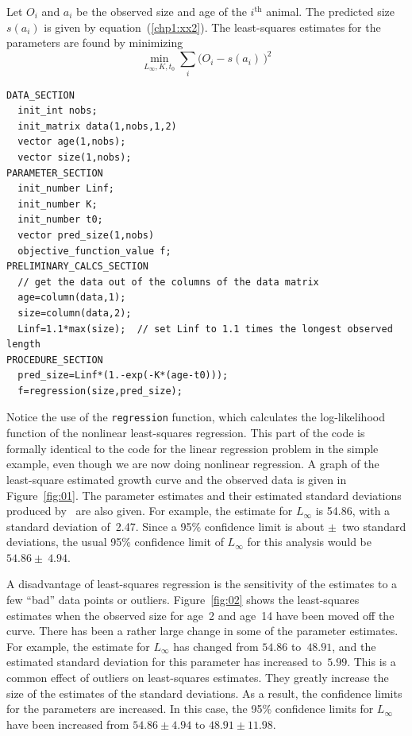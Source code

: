 \documentclass{admbmanual}
\begin{document}
Let $O_i$ and $a_i$ be the observed size and age of the $i^\textrm{th}$ animal.
The predicted size $s(a_i)$ is given by equation~(\ref{chp1:xx2}). The
least-squares estimates for the parameters are found by minimizing
\begin{equation*}
  \min_{L_\infty,K,t_0} \sum_i \big(O_i -s(a_i)\,\big)^2
\end{equation*}
\begin{lstlisting}
DATA_SECTION
  init_int nobs;
  init_matrix data(1,nobs,1,2)
  vector age(1,nobs);
  vector size(1,nobs);
PARAMETER_SECTION
  init_number Linf;
  init_number K;
  init_number t0;
  vector pred_size(1,nobs)
  objective_function_value f;
PRELIMINARY_CALCS_SECTION
  // get the data out of the columns of the data matrix
  age=column(data,1);
  size=column(data,2);
  Linf=1.1*max(size);  // set Linf to 1.1 times the longest observed length
PROCEDURE_SECTION
  pred_size=Linf*(1.-exp(-K*(age-t0)));
  f=regression(size,pred_size);
\end{lstlisting}
Notice the use of the \texttt{regression} function, which calculates the
log-likelihood function of the nonlinear least-squares regression. This part of
the code is formally identical to the code for the linear regression problem in
the simple example, even though we are now doing nonlinear regression. A graph
of the least-square estimated growth curve and the observed data is given in
Figure~\ref{fig:01}. The parameter estimates and their estimated standard
deviations produced by \ADM\ are also given. For example, the estimate for
$L_\infty$ is 54.86, with a standard deviation of~2.47. Since a 95\% confidence
limit is about $\pm$~two standard deviations, the usual 95\% confidence limit of
$L_\infty$ for this analysis would be $54.86\pm~4.94$.

A disadvantage of least-squares regression is the sensitivity of the estimates
to a few ``bad'' data points or outliers. Figure~\ref{fig:02} shows the
least-squares estimates when the observed size for age~2 and age~14 have been
moved off the curve. There has been a rather large change in some of the
parameter estimates. For example, the estimate for $L_\infty$ has changed from
$54.86$ to~$48.91$, and the estimated standard deviation for this parameter has
increased to~$5.99$. This is a common effect of outliers on least-squares
estimates. They greatly increase the size of the estimates of the standard
deviations. As a result, the confidence limits for the parameters are increased.
In this case, the 95\% confidence limits for $L_\infty$ have been increased from
$54.86\pm 4.94$ to $48.91\pm 11.98$.
\end{document}
